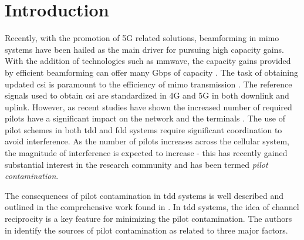 \section{Introduction}\label{sec:pilot_introduction}

Recently, with the promotion of 5G related solutions, beamforming in \gls{mimo} systems have been hailed as the main driver for pursuing high capacity gains. With the addition of technologies such as \gls{mmwave}, the capacity gains provided by efficient beamforming can offer many Gbps of capacity \cite{Ahmed2018APerspectives}. The task of obtaining updated \gls{csi} is paramount to the efficiency of \gls{mimo} transmission \cite{Lee2012TheInterference, Medard2000TheChannel}. The reference signals used to obtain \gls{csi} are standardized in 4G and 5G in both downlink and uplink. However, as recent studies have shown the increased number of required pilots have a significant impact on the network and the terminals \cite{Elijah2016ASystem}. The use of pilot schemes in both \gls{tdd} and \gls{fdd} systems require significant coordination to avoid interference. As the number of pilots increases across the cellular system, the magnitude of interference is expected to increase - this has recently gained substantial interest in the research community and has been termed \emph{pilot contamination}. 





The consequences of pilot contamination in \gls{tdd} systems is well described and outlined in the comprehensive work found in \cite{Elijah2016ASystem}. In \gls{tdd} systems, the idea of channel reciprocity is a key feature for minimizing the pilot contamination. The authors in \cite{Elijah2016ASystem} identify the sources of pilot contamination as related to three major factors.

